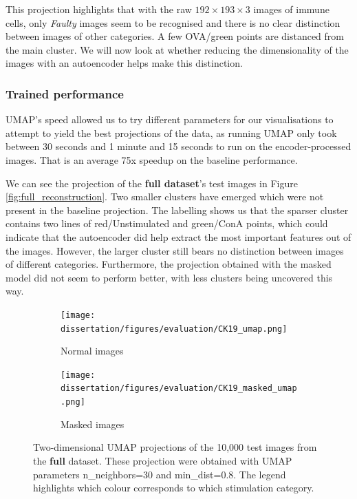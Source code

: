 This projection highlights that with the raw $192\times193\times3$ images of immune cells, only \textit{Faulty} images seem to be recognised and there is no clear distinction between images of other categories. A few OVA/green points are distanced from the main cluster. We will now look at whether reducing the dimensionality of the images with an autoencoder helps make this distinction.

\bigskip
\subsubsection{Trained performance}
\hfill
\hfill

UMAP's speed allowed us to try different parameters for our visualisations to attempt to yield the best projections of the data, as running UMAP only took between 30 seconds and 1 minute and 15 seconds to run on the encoder-processed images. That is an average 75x speedup on the baseline performance.

We can see the projection of the \textbf{full dataset}'s test images in Figure \ref{fig:full_reconstruction}. Two smaller clusters have emerged which were not present in the baseline projection. The labelling shows us that the sparser cluster contains two lines of red/Unstimulated and green/ConA points, which could indicate that the autoencoder did help extract the most important features out of the images. However, the larger cluster still bears no distinction between images of different categories. Furthermore, the projection obtained with the masked model did not seem to perform better, with less clusters being uncovered this way.

\begin{figure}[h!]
    \centering
    \begin{subfigure}[h!]{0.45\textwidth}
        \texttt{[image: dissertation/figures/evaluation/CK19\_umap.png]}
        \caption{Normal images}
        \label{subfig:full_projection_normal}
    \end{subfigure}
    \begin{subfigure}[h!]{0.45\textwidth}
        \texttt{[image: dissertation/figures/evaluation/CK19\_masked\_umap.png]}
        \caption{Masked images}
    \end{subfigure}
    \caption{Two-dimensional UMAP projections of the 10,000 test images from the \textbf{full} dataset. These projection were obtained with UMAP parameters n\_neighbors=30 and min\_dist=0.8. The legend highlights which colour corresponds to which stimulation category.}
    \label{fig:full_projection}
\end{figure}

